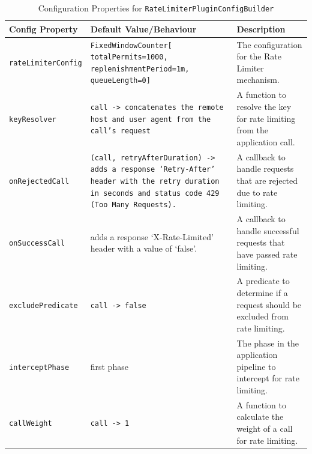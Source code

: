 \begin{table}[!htb]
    \centering
    \caption{Configuration Properties for \texttt{RateLimiterPluginConfigBuilder}}
    \label{tab:rate-limiter-config-builder}
    \vspace{0.3cm}
    \begin{tabular}{|l|p{5cm}|p{6cm}|}
        \hline
        \textbf{Config Property}   & \textbf{Default Value/Behaviour}                                                       & \textbf{Description}                                                         \\ \hline
        \texttt{rateLimiterConfig} & \texttt{FixedWindowCounter[ totalPermits=1000, replenishmentPeriod=1m, queueLength=0]} & The configuration for the Rate Limiter mechanism. \\ \hline
        \texttt{keyResolver}       & \texttt{call -> concatenates the remote host and user agent from the call's request} & A function to resolve the key for rate limiting from the application call. \\ \hline
        \texttt{onRejectedCall} & \texttt{(call, retryAfterDuration) -> adds a response `Retry-After'
        header with the retry duration in seconds and status code 429
            (Too Many Requests).} & A callback to handle requests that are rejected due to rate limiting. \\ \hline
        \texttt{onSuccessCall} & adds a response `X-Rate-Limited' header with a value of `false'.
        & A callback to handle successful requests that have passed rate limiting. \\ \hline
        \texttt{excludePredicate}  & \texttt{call -> false}                                                                 & A predicate to determine if a request should be excluded from rate limiting. \\ \hline
        \texttt{interceptPhase}    & first phase                                                                            & The phase in the application pipeline to intercept for rate limiting.        \\ \hline
        \texttt{callWeight}        & \texttt{call -> 1}                                                                     & A function to calculate the weight of a call for rate limiting.              \\ \hline
    \end{tabular}
\end{table}
